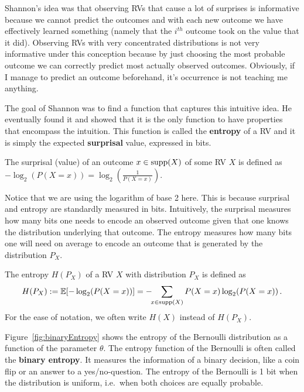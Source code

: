 Shannon's idea was that observing RVs that cause a lot of surprises is informative because we cannot predict the outcomes and with each new outcome we have effectively
learned something  (namely that the $ i^{th} $ outcome took on the value that it did). Observing RVs with very concentrated distributions is not very informative
under this conception because by just choosing the most probable outcome we can correctly predict most actually observed outcomes. Obviously, if I manage to predict
an outcome beforehand, it's occurrence is not teaching me anything.

The goal of Shannon was to find a function that captures this intuitive idea. He eventually found it and showed that it is the only function to have properties
that encompass the intuition. This function is called the
\textbf{entropy} of a RV and it is simply the expected
\textbf{surprisal} value, expressed in bits.

\begin{Definition}[Surprisal]
The surprisal (value) of an outcome $ x \in \operatorname{supp}(X) $ of some RV $ X
$ is defined as $ -\log_{2}(P(X=x)) = \log_2(\frac{1}{P(X=x)})$.
\end{Definition} 

Notice that we are using the logarithm of base 2 here. This is because surprisal and entropy are standardly measured in bits. Intuitively, the surprisal measures
how many bits one needs to encode an observed outcome given that one knows the distribution underlying that outcome. The entropy measures how many bits one
will need on average to encode an outcome that is generated by the distribution $ P_{X} $.

\begin{Definition}[Entropy]
The entropy $H(P_X)$ of a RV $ X $ with distribution $P_X$ is defined as 
$$H(P_X) := \mathbb{E}[-\log_{2}(P(X=x))] = - \!\! \sum_{x \in \operatorname{supp}(X)} P(X=x) \log_2(P(X=x)) \, .$$ 
For the ease of notation, we often write $H(X)$ instead of $H(P_X)$.
\end{Definition}

Figure~\ref{fig:binaryEntropy} shows the entropy of the Bernoulli distribution as a function of the
parameter $ \theta $. The entropy function of the Bernoulli is often called the \textbf{binary entropy}.
It measures the information of a binary decision, like a coin flip or an answer to a yes/no-question.
The entropy of the Bernoulli is 1 bit when the distribution is uniform, i.e.\ when both choices are equally 
probable. 


